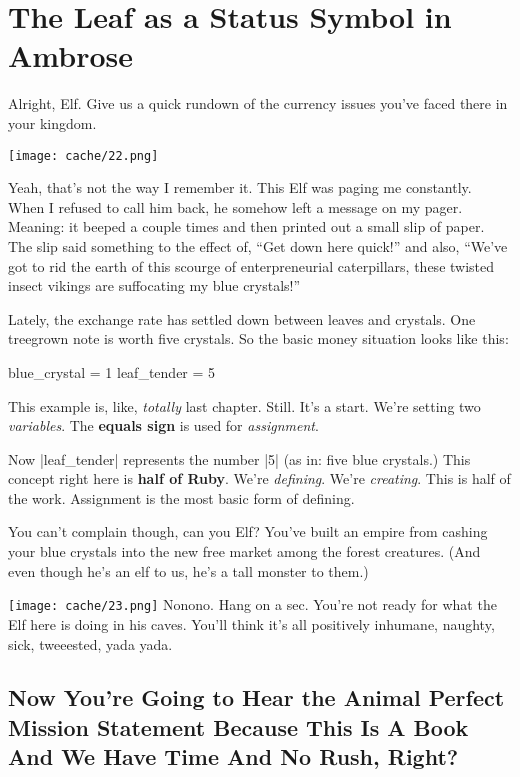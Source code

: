 \documentclass[12pt,twoside]{report}
\begin{document}
\section{The Leaf as a Status Symbol in Ambrose}


Alright, Elf.  Give us a quick rundown of the currency issues you've
faced there in your kingdom.

	\texttt{[image: cache/22.png]}

Yeah, that's not the way I remember it.  This Elf was paging me
constantly.  When I refused to call him back, he somehow left a
message on my pager.  Meaning: it beeped a couple times and then
printed out a small slip of paper.  The slip said something to the
effect of, ``Get down here quick!'' and also, ``We've got to rid the
earth of this scourge of enterpreneurial caterpillars, these twisted
insect vikings are suffocating my blue crystals!''

Lately, the exchange rate has settled down between leaves and
crystals.  One treegrown note is worth five crystals.  So the basic
money situation looks like this:


\begin{rubycode}

 blue_crystal = 1 
 leaf_tender = 5

\end{rubycode}


This example is, like, {\em totally} last chapter.  Still.  It's a
start.  We're setting two {\em variables}. The {\bf equals sign} is
used for {\em assignment}.

Now \rubyinline|leaf_tender| represents the number
\rubyinline|5| (as in: five blue crystals.)  This
concept right here is {\bf half of Ruby}.  We're {\em defining}.
We're {\em creating}.  This is half of the work.  Assignment is the
most basic form of defining.

You can't complain though, can you Elf?  You've built an empire from
cashing your blue crystals into the new free market among the forest
creatures.  (And even though he's an elf to us, he's a tall monster to
them.)

	\texttt{[image: cache/23.png]} Nonono.
        Hang on a sec.  You're not ready for what the Elf here is
        doing in his caves. You'll think it's all positively inhumane,
        naughty, sick, tweeested, yada yada.



\subsection{ Now You're Going to Hear the Animal Perfect Mission
  Statement Because This Is A Book And We Have Time And No Rush,
  Right?}
\end{document}
